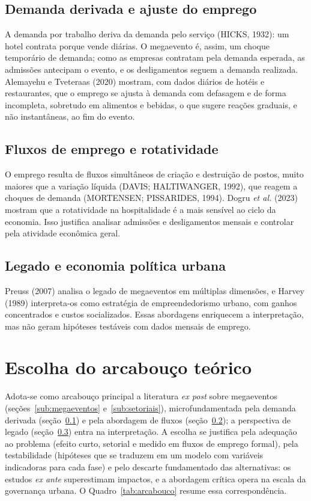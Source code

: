 \subsection{Demanda derivada e ajuste do emprego}\label{sub:demanda}

A demanda por trabalho deriva da demanda pelo serviço (HICKS, 1932): um hotel
contrata porque vende diárias. O megaevento é, assim, um choque temporário de
demanda; como as empresas contratam pela demanda esperada, as admissões
antecipam o evento, e os desligamentos seguem a demanda realizada. Alemayehu e
Tveteraas (2020) mostram, com dados diários de hotéis e restaurantes, que o
emprego se ajusta à demanda com defasagem e de forma incompleta, sobretudo em
alimentos e bebidas, o que sugere reações graduais, e não instantâneas, ao fim
do evento.

\subsection{Fluxos de emprego e rotatividade}\label{sub:fluxos}

O emprego resulta de fluxos simultâneos de criação e destruição de postos,
muito maiores que a variação líquida (DAVIS; HALTIWANGER, 1992), que reagem a
choques de demanda (MORTENSEN; PISSARIDES, 1994). Dogru \textit{et al.} (2023)
mostram que a rotatividade na hospitalidade é a mais sensível ao ciclo da
economia. Isso justifica analisar admissões e desligamentos mensais e
controlar pela atividade econômica geral.

\subsection{Legado e economia política urbana}\label{sub:legado}

Preuss (2007) analisa o legado de megaeventos em múltiplas dimensões, e Harvey
(1989) interpreta-os como estratégia de empreendedorismo urbano, com ganhos
concentrados e custos socializados. Essas abordagens enriquecem a
interpretação, mas não geram hipóteses testáveis com dados mensais de emprego.

\section{Escolha do arcabouço teórico}

Adota-se como arcabouço principal a literatura \textit{ex post} sobre
megaeventos (seções~\ref{sub:megaeventos} e~\ref{sub:setoriais}), microfundamentada pela demanda derivada (seção~\ref{sub:demanda})
e pela abordagem de fluxos (seção~\ref{sub:fluxos}); a perspectiva de legado (seção~\ref{sub:legado}) entra na
interpretação. A escolha se justifica pela adequação ao problema (efeito curto,
setorial e medido em fluxos de emprego formal), pela testabilidade (hipóteses
que se traduzem em um modelo com variáveis indicadoras para cada fase) e pelo
descarte fundamentado das alternativas: os estudos \textit{ex ante}
superestimam impactos, e a abordagem crítica opera na escala da governança
urbana. O Quadro~\ref{tab:arcabouco} resume essa correspondência.


